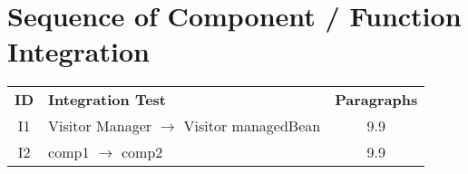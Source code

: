 \section{Sequence of Component / Function Integration}

\begin{table}[!htbp]
\begin{center}
\begin{tabular}[t]{cp{}c}

\hline
\textbf{ID} & \textbf{Integration Test} & \textbf{Paragraphs} \\
I1 & Visitor Manager $\rightarrow$ Visitor managedBean & 9.9 \\
\hline
I2 & comp1 $\rightarrow$ comp2 & 9.9 \\
\hline

\end{tabular}
\end{center}
\end{table}
\clearpage